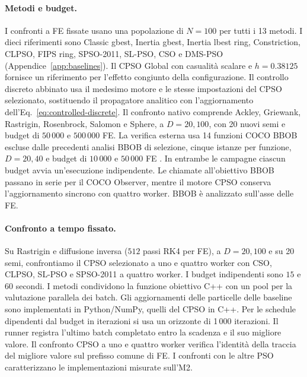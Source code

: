 \paragraph{Metodi e budget.}
I confronti a FE fissate usano una popolazione di $N=100$ per tutti i 13 metodi. I dieci riferimenti sono Classic gbest, Inertia gbest, Inertia lbest ring, Constriction, CLPSO, FIPS ring, SPSO-2011, SL-PSO, CSO e DMS-PSO (Appendice~\ref{app:baselines}). Il CPSO Global con casualità scalare e $h=0.38125$ fornisce un riferimento per l'effetto congiunto della configurazione. Il controllo discreto abbinato usa il medesimo motore e le stesse impostazioni del CPSO selezionato, sostituendo il propagatore analitico con l'aggiornamento dell'Eq.~\eqref{eq:controlled-discrete}. Il confronto nativo comprende Ackley, Griewank, Rastrigin, Rosenbrock, Salomon e Sphere, a $D=20,100$, con 20 nuovi semi e budget di $50\,000$ e $500\,000$ FE. La verifica esterna usa 14 funzioni COCO BBOB escluse dalle precedenti analisi BBOB di selezione, cinque istanze per funzione, $D=20,40$ e budget di $10\,000$ e $50\,000$ FE \citep{Hansen2021,Hansen2016Procedure}. In entrambe le campagne ciascun budget avvia un'esecuzione indipendente. Le chiamate all'obiettivo BBOB passano in serie per il COCO Observer, mentre il motore CPSO conserva l'aggiornamento sincrono con quattro worker. BBOB è analizzato sull'asse delle FE.

\paragraph{Confronto a tempo fissato.}
Su Rastrigin e diffusione inversa ($512$ passi RK4 per FE), a $D=20,100$ e su 20 semi, confrontiamo il CPSO selezionato a uno e quattro worker con CSO, CLPSO, SL-PSO e SPSO-2011 a quattro worker. I budget indipendenti sono $15$ e $60$ secondi. I metodi condividono la funzione obiettivo C++ con un pool per la valutazione parallela dei batch. Gli aggiornamenti delle particelle delle baseline sono implementati in Python/NumPy, quelli del CPSO in C++. Per le schedule dipendenti dal budget in iterazioni si usa un orizzonte di 1\,000 iterazioni. Il runner registra l'ultimo batch completato entro la scadenza e il suo migliore valore. Il confronto CPSO a uno e quattro worker verifica l'identità della traccia del migliore valore sul prefisso comune di FE. I confronti con le altre PSO caratterizzano le implementazioni misurate sull'M2.

